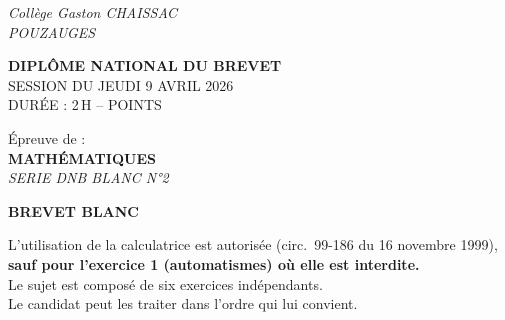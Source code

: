\documentclass[a4paper,12pt]{article}
\begin{document}
\thispagestyle{fancy}


\begin{flushleft}
{\fontsize{12}{14}\selectfont\textit{Collège Gaston CHAISSAC}}\\[2pt]
{\fontsize{12}{14}\selectfont\textit{POUZAUGES}}
\end{flushleft}

\vspace{1.5cm}

\begin{center}
  {\LARGE\bfseries DIPLÔME NATIONAL DU BREVET}\\[0.6cm]
  {\large SESSION DU JEUDI 9 AVRIL 2026}\\[0.3cm]
  {\large DURÉE : 2\,H \;-- POINTS}
\end{center}

\vspace{1cm}

\begin{center}
\begin{tcolorbox}[
  width=12cm,
  colback=gray!25,
  colframe=gray!25,
  arc=4pt,
  boxrule=0pt,
  halign=center,
  top=10pt, bottom=10pt
]
  {\normalsize Épreuve de :}\\[0.5cm]
  {\Large\bfseries MATHÉMATIQUES}\\[0.4cm]
  {\large\itshape SERIE DNB BLANC N°2}\\[0.5cm]
  \begin{tcolorbox}[
    width=7cm,
    colback=white,
    colframe=black,
    arc=3pt,
    boxrule=0.5pt,
    halign=center,
    top=4pt, bottom=4pt
  ]
    {\normalsize\bfseries BREVET BLANC}
  \end{tcolorbox}
\end{tcolorbox}
\end{center}

\vspace{1cm}

\begin{center}
  L'utilisation de la calculatrice est autorisée (circ.\ 99-186 du 16 novembre 1999),\\
  \textbf{sauf pour l'exercice 1 (automatismes) où elle est interdite.}\\[0.3cm]
  Le sujet est composé de six exercices indépendants.\\[0.15cm]
  Le candidat peut les traiter dans l'ordre qui lui convient.
\end{center}
\end{document}
